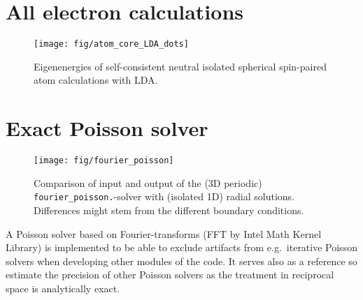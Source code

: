 \documentclass[oribibl]{llncs}
\newcommand{\ttt}[1]{\texttt{#1}}
\begin{document}
\section{All electron calculations}\label{sec:all-electron}
%
\begin{figure}
  \begin{minipage}[c]{.990\textwidth}
	\texttt{[image: fig/atom\_core\_LDA\_dots]} %
  \end{minipage}\hfill
  \begin{minipage}[c]{.009\textwidth}
  \end{minipage}
  \label{fig:atom_core_levels}
  \caption{
	Eigenenergies of self-consistent neutral isolated spherical spin-paired atom calculations with LDA.
  }
\end{figure}
%
%

\section{Exact Poisson solver}
%
\begin{figure}
  \begin{minipage}[c]{.990\textwidth}
	\texttt{[image: fig/fourier\_poisson]} %
  \end{minipage}\hfill
  \begin{minipage}[c]{.009\textwidth}
  \end{minipage}
  \label{fig:fourier_poisson_solver}
  \caption{
	Comparison of input and output of the (3D periodic) \ttt{fourier\_poisson.}-solver with (isolated 1D) radial solutions.
	Differences might stem from the different boundary conditions.
  }
\end{figure}
%
%
A Poisson solver based on Fourier-transforms (FFT by Intel Math Kernel Library)
is implemented to be able to exclude artifacts from e.g.~iterative Poisson solvers
when developing other modules of the code. 
It serves also as a reference so estimate the precision of other Poisson solvers
as the treatment in reciprocal space is analytically exact.
\end{document}
